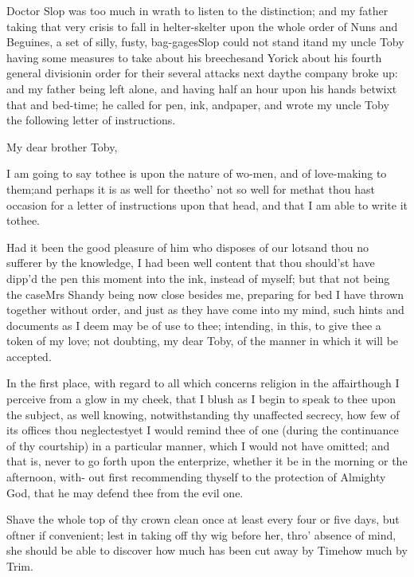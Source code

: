 \documentclass[twoside]{article}
\begin{document}
Doctor Slop was too much in wrath to listen to the
distinction; and my father taking that very crisis to fall in
helter-skelter upon the whole order of Nuns and Beguines, a
set of silly, fusty, bag-\break gages\tsh Slop could not stand
it\tsh\break and my uncle Toby having some measures to take
about his breeches\tsk and Yorick about his fourth general
division\break\tsk in order for their several attacks next
day\tsk the company broke up: and my father being left alone, and
having half an hour upon his hands betwixt that and bed-time; he
called for pen, ink, and\break paper, and wrote my uncle Toby the
following letter of instructions.

\vfill {}\eject
\setlength{\baselineskip}{13.36pt} %
My dear brother Toby,

\vskip -6pt

 I am going to say to\break thee is
upon the nature of wo-\break men, and of
love-making to them;\break and perhaps
it is as well for thee\tsk tho’ not so well for
me\tsk that thou hast occasion for a letter of instructions upon
that head, and that I am able to write it to\break thee.

Had it been the good pleasure of him who disposes of our
lots\tsk and thou no sufferer by the knowledge, I had been well content that thou should’st have
dipp’d the pen this moment into the ink, instead of myself;
but that not being the case\tsh\tsk Mrs Shandy
being now close besides me, preparing for bed\tsh{}
I have thrown together without order, and just as they have come into my mind, such
hints and documents as I deem may be of use to thee; intending, in this, to give
thee a token of my love; not doubting, my dear Toby, of the manner in which it will
be accepted.

In the first place, with regard to all which concerns religion
in the affair\tsh\break though I perceive from a glow in my
cheek, that I blush as I begin to speak to thee upon the subject,
as well knowing, notwithstanding thy unaffected secrecy, how few of
its offices thou neglectest\tsk yet I would remind thee of one
(during the continuance of thy courtship) in a particular manner,
which I would not have omitted; and that is, never to go forth upon
the enterprize, whether it be in the morning or the afternoon,
with-
out first recommending thyself to the protection of Almighty
God, that he may defend thee from the evil one.

Shave the whole top of thy crown clean once at least every four
or five days, but oftner if convenient; lest in taking off thy wig
before her, thro’ absence of mind, she should be able to
discover how much has been cut away by Time\tsh how much
by Trim.
\end{document}
